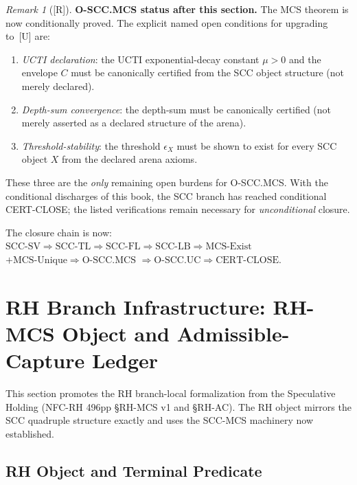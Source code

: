 \documentclass[12pt,oneside]{amsbook}
\theoremstyle{plain}
\theoremstyle{definition}
\theoremstyle{remark}
\newtheorem{remark}[theorem]{Remark}
\newcommand{\status}[1]{\textup{[#1]}}
\begin{document}
\begin{remark}[\status{R}]\label{rem:scc-mcs-status}
\textbf{O-SCC.MCS status after this section.}
The MCS theorem is now conditionally proved. The explicit named
open conditions for upgrading to~[U] are:
\begin{enumerate}[label=\textup{(\arabic*)}]
 \item \emph{UCTI declaration}: the UCTI exponential-decay
 constant $\mu > 0$ and the envelope $C$ must be canonically
 certified from the SCC object structure (not merely declared).
 \item \emph{Depth-sum convergence}: the depth-sum must be
 canonically certified (not merely asserted as a declared
 structure of the arena).
 \item \emph{Threshold-stability}: the threshold $\epsilon_X$
 must be shown to exist for every SCC object $X$ from the
 declared arena axioms.
\end{enumerate}
These three are the \emph{only} remaining open burdens for
O-SCC.MCS. With the conditional discharges of this book, the SCC
branch has reached conditional CERT-CLOSE; the listed verifications
remain necessary for \emph{unconditional} closure.

The closure chain is now:
$\mathrm{SCC\text{-}SV} \Rightarrow \mathrm{SCC\text{-}TL}
\Rightarrow \mathrm{SCC\text{-}FL} \Rightarrow
\mathrm{SCC\text{-}LB} \Rightarrow \mathrm{MCS\text{-}Exist}$
$+ \mathrm{MCS\text{-}Unique} \Rightarrow \mathrm{O\text{-}SCC.MCS}$
$\Rightarrow \mathrm{O\text{-}SCC.UC} \Rightarrow \mathrm{CERT\text{-}CLOSE}$.
\end{remark}

\section{RH Branch Infrastructure: RH-MCS Object and Admissible-Capture Ledger}
\label{sec:rh-infrastructure}

This section promotes the RH branch-local formalization from the
Speculative Holding (NFC-RH 496pp §RH-MCS v1 and §RH-AC).
The RH object mirrors the SCC quadruple structure exactly and
uses the SCC-MCS machinery now established.

\subsection{RH Object and Terminal Predicate}
\end{document}
